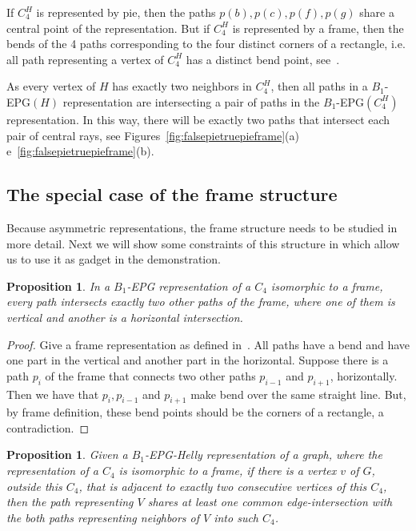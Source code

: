 \documentclass[a4paper,11pt]{article}
\newtheorem{prop}[theorem]{Proposition}
\begin{document}
If $C_4^H$ is represented by pie, then the paths $p(b), p(c), p(f), p(g)$ share a central point of the representation. But if $C_4^H$ is represented by a frame, then the bends of the 4 paths corresponding to the four distinct corners of a rectangle, i.e. all path representing a vertex of $C_4^H$ has a distinct bend point, see~\citep{golumbic2009}.

As every vertex of $H$ has exactly two neighbors in $C_4^H $, then all paths in a $B_1$-EPG$(H)$ representation are intersecting a pair of paths in the $B_1$-EPG$(C_4^H)$ representation. In this way, there will be exactly two paths that intersect each pair of central rays, see Figures~\ref{fig:falsepietruepieframe}(a) e~\ref{fig:falsepietruepieframe}(b). 

\subsection{The special case of the frame structure} \label{subsec:moldura}

Because asymmetric representations, the frame structure needs to be studied in more detail. Next we will show some constraints of this structure in which allow us to use it as gadget in the demonstration.

\begin{prop}\label{lem:direcoesdiferentes}
In a $B_1$-EPG representation of a $C_4$ isomorphic to a frame, every path intersects exactly two other paths of the frame, where one of them is vertical and another is a horizontal intersection.
\end{prop}

\begin{proof}
Give a frame representation as defined in~\citep{golumbic2009}. All paths have a bend and have one part in the vertical and another part in the horizontal. Suppose there is a path $p_i$ of the frame that connects two other paths $p_{i-1} $ and $ p_{i + 1}$, horizontally. Then we have that $p_i, p_{i-1}$ and $ p_{i + 1}$ make bend over the same straight line. But, by frame definition, these bend points should be the corners of a rectangle, a contradiction.
\end{proof}

\begin{prop}\label{lem:mesmaretasuporte}
Given a $B_1$-EPG-Helly representation of a graph, where the representation of a $C_4$ is isomorphic to a frame, if there is a vertex $v$ of $G$, outside this $C_4$, that is adjacent to exactly two consecutive vertices of this $C_4$, then the path representing $V$ shares at least one common edge-intersection with the both paths representing neighbors of $V$ into such $C_4$.  
\end{prop}
\end{document}
